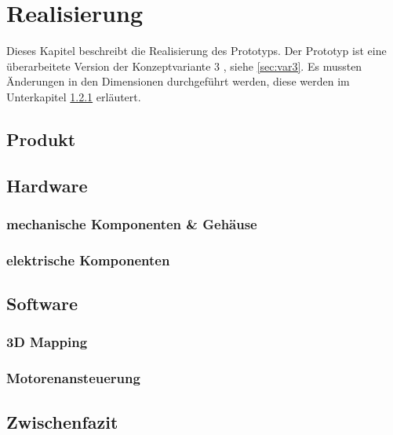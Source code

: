 \chapter{Realisierung}
\label{chap:Realisierung}

Dieses Kapitel beschreibt die Realisierung des Prototyps. Der Prototyp ist eine überarbeitete Version der Konzeptvariante 3 , siehe \ref{sec:var3}. Es mussten Änderungen in den Dimensionen durchgeführt werden, diese werden im Unterkapitel \ref{sec:mechKomp} erläutert. 

\section{Produkt}
\label{sec:Produkt}

\section {Hardware}
\label{sec:Hardware}

\subsection {mechanische Komponenten \& Gehäuse}
\label{sec:mechKomp}

\subsection {elektrische Komponenten}
\label{sec:elekKomp}

\section{Software}
\label{sec:SoftwareReal}

\subsection {3D Mapping}
\label{sec:3DMapping}

\subsection {Motorenansteuerung}
\label{sec:Motorenansteuerung}

\section{Zwischenfazit}
\label{sec:ZwischenfazitReal}